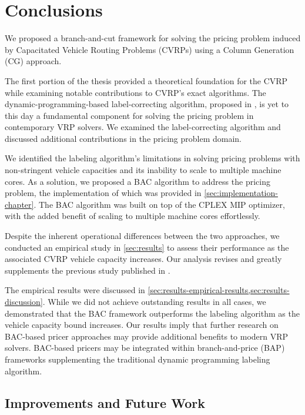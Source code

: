 \chapter{Conclusions}
\label{sec:conclusions}

We proposed a branch-and-cut framework for solving the pricing problem
induced by Capacitated Vehicle Routing Problems (CVRPs)
using a Column Generation (CG) approach.

The first portion of the thesis provided a theoretical foundation for the CVRP
while examining notable contributions to CVRP's exact algorithms.
The dynamic-programming-based label-correcting algorithm,
proposed in \textcite{desrochers1992, feillet2004},
is yet to this day a fundamental component for solving the pricing problem
in contemporary VRP solvers.
We examined the label-correcting algorithm
and discussed additional contributions in the pricing problem domain.

\medskip

We identified the labeling algorithm's limitations in solving pricing problems
with non-stringent vehicle capacities
and its inability to scale to multiple machine cores.
As a solution, we proposed a BAC algorithm to address the pricing problem,
the implementation of which was provided in \cref{sec:implementation-chapter}.
The BAC algorithm was built on top of the CPLEX MIP optimizer,
with the added benefit of scaling to multiple machine cores effortlessly.

Despite the inherent operational differences between the two approaches, we conducted an empirical study in \cref{sec:results}
to assess their performance as the associated CVRP vehicle capacity increases.
Our analysis revises and greatly supplements the previous study published in \textcite{jepsen2014}.

\medskip

The empirical results were discussed in \cref{sec:results-empirical-results,sec:results-discussion}.
While we did not achieve outstanding results in all cases,
we demonstrated that the BAC framework outperforms
the labeling algorithm as the vehicle capacity bound increases.
Our results imply that further research on BAC-based pricer approaches
may provide additional benefits to modern VRP solvers.
BAC-based pricers may be integrated within branch-and-price (BAP) frameworks
supplementing the traditional dynamic programming labeling algorithm.

\section{Improvements and Future Work}
\label{sec:conclusions-improvements-and-future-work}

